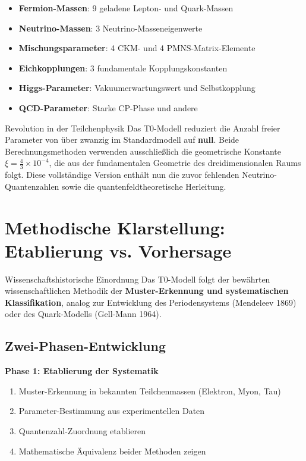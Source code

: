 \documentclass[12pt,a4paper]{article}
\newcommand{\xipar}{\xi}
\begin{document}
	\begin{itemize}
		\item \textbf{Fermion-Massen}: 9 geladene Lepton- und Quark-Massen
		\item \textbf{Neutrino-Massen}: 3 Neutrino-Masseneigenwerte
		\item \textbf{Mischungsparameter}: 4 CKM- und 4 PMNS-Matrix-Elemente
		\item \textbf{Eichkopplungen}: 3 fundamentale Kopplungskonstanten
		\item \textbf{Higgs-Parameter}: Vakuumerwartungswert und Selbstkopplung
		\item \textbf{QCD-Parameter}: Starke CP-Phase und andere
	\end{itemize}
	
	\begin{important}{Revolution in der Teilchenphysik}{}
		Das T0-Modell reduziert die Anzahl freier Parameter von über zwanzig im Standardmodell auf \textbf{null}. Beide Berechnungsmethoden verwenden ausschließlich die geometrische Konstante $\xipar = \frac{4}{3} \times 10^{-4}$, die aus der fundamentalen Geometrie des dreidimensionalen Raums folgt. Diese vollständige Version enthält nun die zuvor fehlenden Neutrino-Quantenzahlen sowie die quantenfeldtheoretische Herleitung.
	\end{important}
	
	\section{Methodische Klarstellung: Etablierung vs. Vorhersage}
	\label{sec:methodische_klarstellung}
	
	\begin{important}{Wissenschaftshistorische Einordnung}{}
		Das T0-Modell folgt der bewährten wissenschaftlichen Methodik der \textbf{Muster-Erkennung und systematischen Klassifikation}, analog zur Entwicklung des Periodensystems (Mendeleev 1869) oder des Quark-Modells (Gell-Mann 1964).
	\end{important}
	
	\subsection{Zwei-Phasen-Entwicklung}
	\label{subsec:zwei_phasen}
	
	\textbf{Phase 1: Etablierung der Systematik}
	\begin{enumerate}
		\item Muster-Erkennung in bekannten Teilchenmassen (Elektron, Myon, Tau)
		\item Parameter-Bestimmung aus experimentellen Daten
		\item Quantenzahl-Zuordnung etablieren
		\item Mathematische Äquivalenz beider Methoden zeigen
	\end{enumerate}
	
\end{document}
